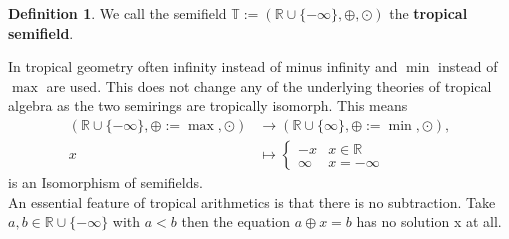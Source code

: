 \documentclass{article}
\theoremstyle{definition}
\newtheorem{definition}[theorem]{Definition}
\begin{document}
\begin{definition}
We call the semifield $\mathbb{T} := ( \mathbb{R} \cup \{- \infty \} , \oplus , \odot )$ the \textbf{tropical semifield}.
\end{definition}

In tropical geometry often infinity instead of minus infinity and $\min$ instead of $\max$ are used. This does not change any of the underlying theories of tropical algebra as the two semirings are tropically isomorph. This means
\begin{align*}
( \mathbb{R} \cup \{- \infty \} , \oplus := \max, \odot ) &\to ( \mathbb{R} \cup \{ \infty \} , \oplus := \min , \odot ), \\
x &\mapsto \begin{cases} -x & x \in \mathbb{R}\\
\infty & x = - \infty
\end{cases}
\end{align*}
is an Isomorphism of semifields. \\
An essential feature of tropical arithmetics is that there is no subtraction. Take $a, b \in \mathbb{R} \cup \{- \infty \}$ with $a < b$ then the equation $a \oplus x=b$ has no solution x at all. \cite[p.~11]{maclagan2015introduction} \\
\end{document}
